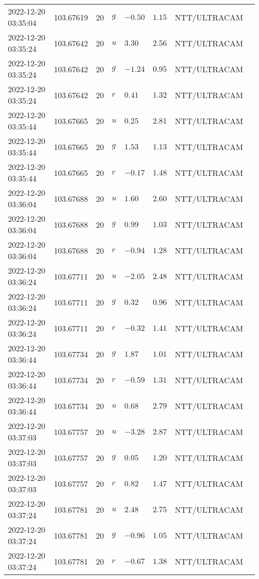 \documentclass{nature_plusfigure}
\begin{document}
\begin{supplement}
\begin{center}
\begin{longtable}{llllllll}
2022-12-20 03:35:04 & 103.67619 & 20 & $g$ & $-0.50$ & $1.15$ & NTT/ULTRACAM &  \\ 
2022-12-20 03:35:24 & 103.67642 & 20 & $u$ & $3.30$ & $2.56$ & NTT/ULTRACAM &  \\ 
2022-12-20 03:35:24 & 103.67642 & 20 & $g$ & $-1.24$ & $0.95$ & NTT/ULTRACAM &  \\ 
2022-12-20 03:35:24 & 103.67642 & 20 & $r$ & $0.41$ & $1.32$ & NTT/ULTRACAM &  \\ 
2022-12-20 03:35:44 & 103.67665 & 20 & $u$ & $0.25$ & $2.81$ & NTT/ULTRACAM &  \\ 
2022-12-20 03:35:44 & 103.67665 & 20 & $g$ & $1.53$ & $1.13$ & NTT/ULTRACAM &  \\ 
2022-12-20 03:35:44 & 103.67665 & 20 & $r$ & $-0.17$ & $1.48$ & NTT/ULTRACAM &  \\ 
2022-12-20 03:36:04 & 103.67688 & 20 & $u$ & $1.60$ & $2.60$ & NTT/ULTRACAM &  \\ 
2022-12-20 03:36:04 & 103.67688 & 20 & $g$ & $0.99$ & $1.03$ & NTT/ULTRACAM &  \\ 
2022-12-20 03:36:04 & 103.67688 & 20 & $r$ & $-0.94$ & $1.28$ & NTT/ULTRACAM &  \\ 
2022-12-20 03:36:24 & 103.67711 & 20 & $u$ & $-2.05$ & $2.48$ & NTT/ULTRACAM &  \\ 
2022-12-20 03:36:24 & 103.67711 & 20 & $g$ & $0.32$ & $0.96$ & NTT/ULTRACAM &  \\ 
2022-12-20 03:36:24 & 103.67711 & 20 & $r$ & $-0.32$ & $1.41$ & NTT/ULTRACAM &  \\ 
2022-12-20 03:36:44 & 103.67734 & 20 & $g$ & $1.87$ & $1.01$ & NTT/ULTRACAM &  \\ 
2022-12-20 03:36:44 & 103.67734 & 20 & $r$ & $-0.59$ & $1.31$ & NTT/ULTRACAM &  \\ 
2022-12-20 03:36:44 & 103.67734 & 20 & $u$ & $0.68$ & $2.79$ & NTT/ULTRACAM &  \\ 
2022-12-20 03:37:03 & 103.67757 & 20 & $u$ & $-3.28$ & $2.87$ & NTT/ULTRACAM &  \\ 
2022-12-20 03:37:03 & 103.67757 & 20 & $g$ & $0.05$ & $1.20$ & NTT/ULTRACAM &  \\ 
2022-12-20 03:37:03 & 103.67757 & 20 & $r$ & $0.82$ & $1.47$ & NTT/ULTRACAM &  \\ 
2022-12-20 03:37:24 & 103.67781 & 20 & $u$ & $2.48$ & $2.75$ & NTT/ULTRACAM &  \\ 
2022-12-20 03:37:24 & 103.67781 & 20 & $g$ & $-0.96$ & $1.05$ & NTT/ULTRACAM &  \\ 
2022-12-20 03:37:24 & 103.67781 & 20 & $r$ & $-0.67$ & $1.38$ & NTT/ULTRACAM &  \\ 

\end{longtable}
\end{center}
\end{supplement}
\end{document}
